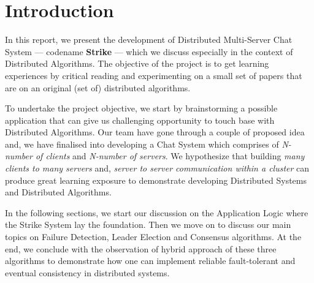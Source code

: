 \documentclass[dareport.tex]{subfiles}
\begin{document}

\section{Introduction}
In this report, we present the development of Distributed Multi-Server Chat System --- codename \textbf{Strike} --- which we discuss especially in the context of Distributed Algorithms. The objective of the project is to get learning experiences by critical reading and experimenting on a small set of papers that are on an original (set of) distributed algorithms.


To undertake the project objective, we start by brainstorming a possible application that can give us challenging opportunity to touch base with Distributed Algorithms. Our team have gone through a couple of proposed idea and, we have finalised into developing a Chat System which comprises of \emph{N-number of clients} and \emph{N-number of servers}. We hypothesize that building \emph{many clients to many servers} and, \emph{server to server communication within a cluster} can produce great learning exposure to demonstrate developing Distributed Systems and Distributed Algorithms. 


In the following sections, we start our discussion on the Application Logic where the Strike System lay the foundation. Then we move on to discuss our main topics on Failure Detection, Leader Election and Consensus algorithms. At the end, we conclude with the observation of hybrid approach of these three algorithms to demonstrate how one can implement reliable fault-tolerant and eventual consistency in distributed systems.
\end{document}
